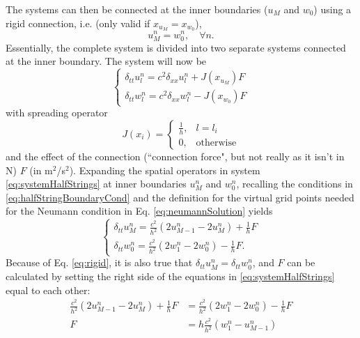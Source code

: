 \documentclass[dvipsnames, reprint]{JASA}
\def\SWcomment[#1]{\textcolor{Bittersweet}{#1}}
\begin{document}
%
The systems can then be connected at the inner boundaries ($u_M$ and $w_0$) using a rigid connection, i.e. \SWcomment[(only valid if $x_{u_M} = x_{w_0}$)],
\begin{equation}\label{eq:rigid}
    u_M^n = w_0^n,\quad \forall n.
\end{equation}
Essentially, the complete system is divided into two separate systems connected at the inner boundary. The system will now be
\begin{equation}
    \begin{cases}\label{eq:systemHalfStrings}
        \delta_{tt}u_l^n = c^2\delta_{xx}u_l^n + J(x_{u_M})F\\
        \delta_{tt}w_l^n = c^2\delta_{xx}w_l^n - J(x_{w_0})F
    \end{cases}
\end{equation}
with spreading operator
\begin{equation}
    J(x_i) =
    \begin{cases}
        \frac{1}{h}, & l = l_i\\
        0,& \text{otherwise}
    \end{cases}
\end{equation}
and the effect of the connection \SWcomment[(``connection force", but not really as it isn't in N)] $F$ (in m$^2$/s$^2$).
%
Expanding the spatial operators in system \eqref{eq:systemHalfStrings} at inner boundaries $u_M^n$ and $w_0^n$, recalling the conditions in  \eqref{eq:halfStringBoundaryCond} and the definition for the virtual grid points needed for the Neumann condition in Eq. \eqref{eq:neumannSolution} yields
\begin{equation}\label{eq:expandedSystem}
    \begin{cases}
        \delta_{tt}u_M^n = \frac{c^2}{h^2}(2u_{M-1}^n-2u_M^n) + \frac{1}{h}F\\
        \delta_{tt}w_0^n = \frac{c^2}{h^2}(2w_1^n-2w_0^n) - \frac{1}{h}F.
    \end{cases}
\end{equation}
Because of Eq. \eqref{eq:rigid}, it is also true that $\delta_{tt}u_M^n = \delta_{tt}w_0^n$, and $F$ can be calculated by setting the \SWcomment[right side of the] equations in \eqref{eq:systemHalfStrings} equal to each other:
\begin{align}
     \frac{c^2}{h^2}(2u_{M-1}^n-2u_M^n) + \frac{1}{h} F&= 
     \frac{c^2}{h^2}(2w_1^n-2w_0^n) - \frac{1}{h} F\nonumber\\
    F &= h \frac{c^2}{h^2}(w_1^n - u_{M-1}^n)
\end{align}
\end{document}
